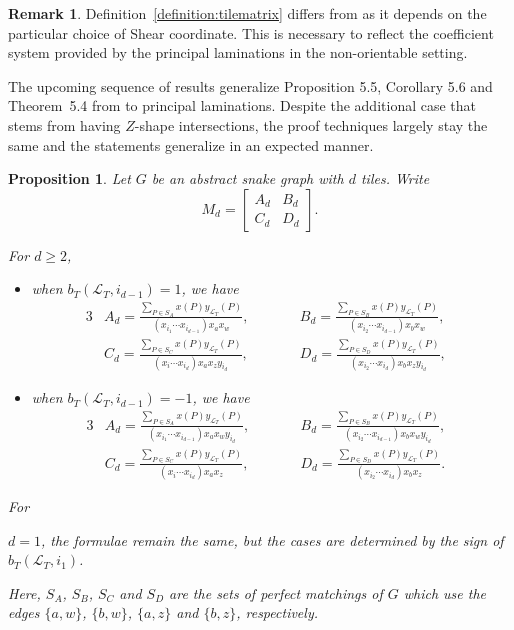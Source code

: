 \documentclass[10pt,a4paper]{amsart}
\numberwithin{equation}{section}
\newtheorem{Proposition}[Theorem]{Proposition}
\theoremstyle{definition}
\newtheorem{Remark}[Theorem]{Remark}
\begin{document}
\begin{Remark}
Definition~\ref{definition:tilematrix} differs from \cite{MW13} as it depends on the particular choice of Shear coordinate. This is necessary to reflect the coefficient system provided by the principal laminations in the non-orientable setting.
\end{Remark}

The upcoming sequence of results generalize Proposition 5.5, Corollary 5.6 and Theorem~5.4 from \cite{MW13} to principal laminations. Despite the additional case that stems from having $Z$-shape intersections, the proof techniques largely stay the same and the statements generalize in an expected manner.

\begin{Proposition}\label{prop:snakematrix}
Let $G$ be an abstract snake graph with $d$ tiles. Write \[M_d=\begin{bmatrix}
A_d & B_d\\
C_d & D_d
\end{bmatrix}.\]

For $d\geq 2$,{\samepage
\begin{itemize}\itemsep=0pt
\item when $b_{T}(\mathcal{L}_{T}, {i_{d-1}})=1$, we have
\begin{alignat*}{3}
& A_d = \frac{\sum_{P\in S_A}x(P)y_{\mathcal{L}_T}(P)}{(x_{i_1}\cdots x_{i_{d-1}})x_ax_w}, \qquad && B_d = \frac{\sum_{P\in S_B}x(P)y_{\mathcal{L}_T}(P)}{(x_{i_2}\cdots x_{i_{d-1}})x_bx_w},&\\
& C_d = \frac{\sum_{P\in S_C}x(P)y_{\mathcal{L}_T}(P)}{(x_{i}\cdots x_{i_d})x_ax_zy_{i_d}}, \qquad && D_d = \frac{\sum_{P\in S_D}x(P)y_{\mathcal{L}_T}(P)}{(x_{i_2}\cdots x_{i_{d}})x_bx_zy_{i_d}},&
\end{alignat*}
\item when $b_{T}(\mathcal{L}_{T}, i_{d-1})=-1$, we have
\begin{alignat*}{3}
& A_d = \frac{\sum_{P\in S_A}x(P)y_{\mathcal{L}_T}(P)}{(x_{i_1}\cdots x_{i_{d-1}})x_ax_wy_{i_d}} ,\qquad&& B_d = \frac{\sum_{P\in S_B}x(P)y_{\mathcal{L}_T}(P)}{(x_{i_2}\cdots x_{i_{d-1}})x_bx_w y_{i_d}},&\\
& C_d = \frac{\sum_{P\in S_C}x(P)y_{\mathcal{L}_T}(P)}{(x_{i}\cdots x_{i_d})x_ax_z} ,\qquad&& D_d = \frac{\sum_{P\in S_D}x(P)y_{\mathcal{L}_T}(P)}{(x_{i_2}\cdots x_{i_{d}})x_bx_z}.&
\end{alignat*}
\end{itemize}
For} $d=1$, the formulae remain the same, but the cases are determined by the sign of $b_T(\mathcal{L}_T, i_1)$.

Here, $S_A$, $S_B$, $S_C$ and $S_D$ are the sets of perfect matchings of $G$ which use the edges $\{a, w\}$, $\{b, w\}$, $\{a, z\}$ and $\{b, z\}$, respectively.
\end{Proposition}
\end{document}
